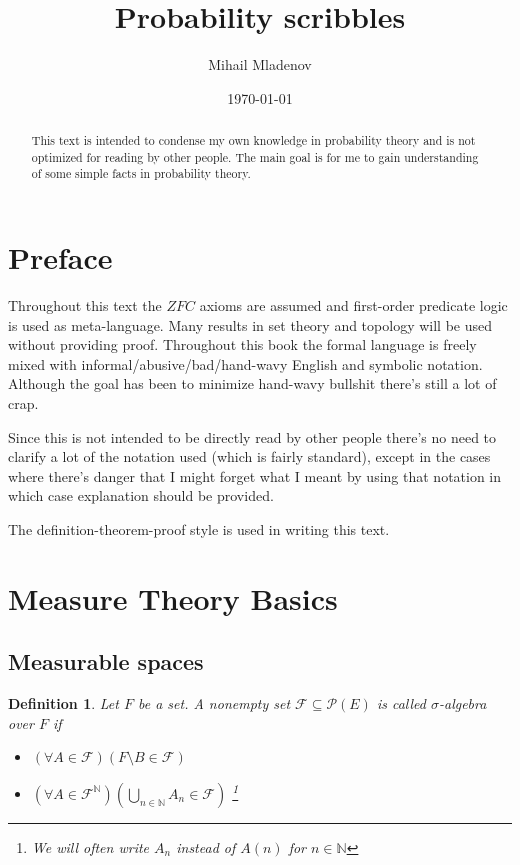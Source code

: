 \documentclass[a4paper]{amsart}
\newtheorem{deff}{Definition}
\newcommand{\pow}[1]{\mathscr{P}\left(#1\right)}
\newcommand{\NN}{\mathbb{N}}
\begin{document}
	
\author{Mihail Mladenov}
\title{Probability scribbles}
\date{\today}
 	
\begin{abstract}
    This text is intended to condense my own knowledge in probability theory and is not optimized for reading by other people. The main goal is for me to gain understanding of some simple facts in probability theory.
\end{abstract}

\maketitle

\tableofcontents
\newpage

\section{Preface}

Throughout this text the $ZFC$ axioms are assumed and 
first-order predicate logic is used as meta-language. Many 
results in set theory and topology will be used without 
providing proof. Throughout this book the formal language is 
freely mixed with informal/abusive/bad/hand-wavy English 
and symbolic notation. Although the goal has been to 
minimize hand-wavy bullshit there's still a lot of crap. 

Since this is not intended to be directly read by other people 
there's no need to clarify a lot of the notation used (which is fairly standard),
except in the cases where there's danger that I might forget 
what I meant by using that notation in which case 
explanation should be provided.

The definition-theorem-proof style is used in writing this text.


\section{Measure Theory Basics}

\subsection{Measurable spaces}

\begin{deff}
    Let $F$ be a set. A nonempty set $\mathcal{F} \subseteq 
    \pow{E}$ is called $\sigma$-algebra over $F$ if
    
    \begin{itemize}
        \item $\left(\forall A \in \mathcal{F}\right)  \left( F 
        \setminus B \in \mathcal{F} \right)$
        \item $\left(\forall A \in \mathcal{F}^\NN\right) \left( 
        \bigcup\limits_{n\in \NN} A_n \in \mathcal{F} \right) $   
        \footnote{We will often write $A_n$ instead of $A(n)$ 
        for $n \in \NN$}
    \end{itemize}
\end{deff}
\end{document}
